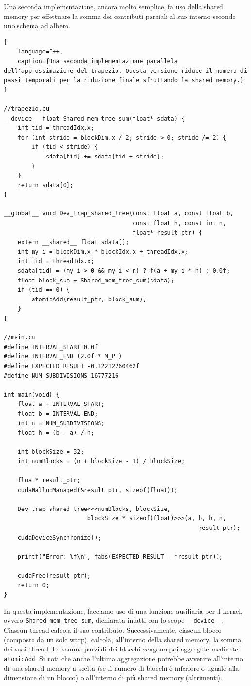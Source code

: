 Una seconda implementazione, ancora molto semplice, fa uso della shared memory per effettuare la somma dei contributi parziali al suo interno secondo uno schema ad albero.

\begin{lstlisting}[
    language=C++, 
    caption={Una seconda implementazione parallela dell'approssimazione del trapezio. Questa versione riduce il numero di passi temporali per la riduzione finale sfruttando la shared memory.}
]

//trapezio.cu
__device__ float Shared_mem_tree_sum(float* sdata) {
    int tid = threadIdx.x;
    for (int stride = blockDim.x / 2; stride > 0; stride /= 2) {
        if (tid < stride) {
            sdata[tid] += sdata[tid + stride];
        }
    }
    return sdata[0];
}

__global__ void Dev_trap_shared_tree(const float a, const float b, 
                                     const float h, const int n, 
                                     float* result_ptr) {
    extern __shared__ float sdata[];
    int my_i = blockDim.x * blockIdx.x + threadIdx.x;
    int tid = threadIdx.x;
    sdata[tid] = (my_i > 0 && my_i < n) ? f(a + my_i * h) : 0.0f;
    float block_sum = Shared_mem_tree_sum(sdata);
    if (tid == 0) {
        atomicAdd(result_ptr, block_sum);
    }
}

//main.cu
#define INTERVAL_START 0.0f
#define INTERVAL_END (2.0f * M_PI)
#define EXPECTED_RESULT -0.12212260462f
#define NUM_SUBDIVISIONS 16777216

int main(void) {
    float a = INTERVAL_START;
    float b = INTERVAL_END;
    int n = NUM_SUBDIVISIONS;
    float h = (b - a) / n;

    int blockSize = 32;
    int numBlocks = (n + blockSize - 1) / blockSize;
    
    float* result_ptr;
    cudaMallocManaged(&result_ptr, sizeof(float));

    Dev_trap_shared_tree<<<numBlocks, blockSize, 
                        blockSize * sizeof(float)>>>(a, b, h, n, 
                                                        result_ptr);
    cudaDeviceSynchronize();

    printf("Error: %f\n", fabs(EXPECTED_RESULT - *result_ptr));
    
    cudaFree(result_ptr);
    return 0;
}

\end{lstlisting}
In questa implementazione, facciamo uso di una funzione ausiliaria per il kernel, ovvero \texttt{Shared\_mem\_tree\_sum}, dichiarata infatti con lo scope \texttt{\_\_device\_\_}.
Ciascun thread calcola il suo contributo. Successivamente, ciascun blocco (composto da un solo warp), calcola, all'interno della shared memory, la somma dei suoi thread.
Le somme parziali dei blocchi vengono poi aggregate mediante \texttt{atomicAdd}.
Si noti che anche l'ultima aggregazione potrebbe avvenire all'interno di una shared memory a scelta (se il numero di blocchi è inferiore o uguale alla dimensione di un blocco) o all'interno di più shared memory (altrimenti).

